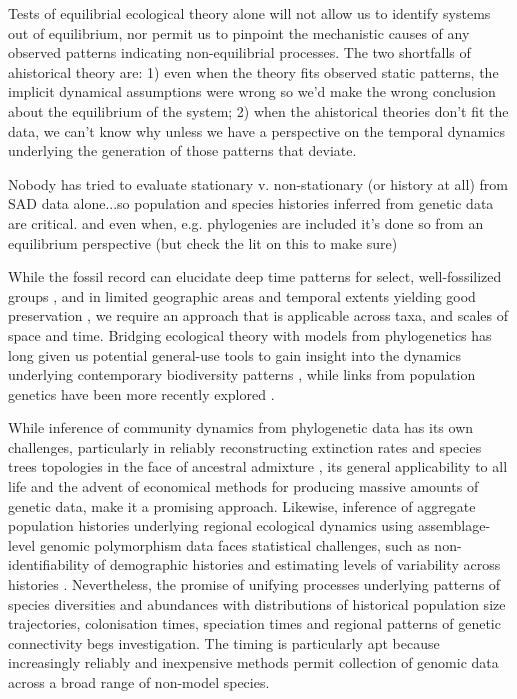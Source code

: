 \documentclass[12pt]{article}
\begin{document}
Tests of equilibrial ecological theory alone will not allow us to
identify systems out of equilibrium, nor permit us to pinpoint the
mechanistic causes of any observed patterns indicating non-equilibrial
processes. The two shortfalls of ahistorical theory are: 1) even when
the theory fits observed static patterns, the implicit dynamical
assumptions were wrong so we'd make the wrong conclusion about the
equilibrium of the system; 2) when the ahistorical theories don't fit
the data, we can't know why unless we have a perspective on the temporal
dynamics underlying the generation of those patterns that deviate.

Nobody has tried to evaluate stationary v. non-stationary (or history at
all) from SAD data alone...so population and species histories inferred
from genetic data are critical. and even when, e.g. phylogenies are
included it's done so from an equilibrium perspective (but check the lit
on this to make sure)

While the fossil record can elucidate deep time patterns for select,
well-fossilized groups \cite{Alroy2008-no}, and in limited geographic
areas and temporal extents yielding good preservation
\cite{Harnik2011-qe}, we require an approach that is applicable across
taxa, and scales of space and time. Bridging ecological theory with
models from phylogenetics has long given us potential general-use
tools to gain insight into the dynamics underlying contemporary
biodiversity patterns \cite{Webb2002-yr, Emerson2002-mw,
  Lavergne2010-ts}, while links from population genetics have been
more recently explored \cite{Webb2002-yr, Emerson2002-mw,
  Lavergne2010-ts, Li2016-ns, McGaughran2015-sy, Laroche2015-qo,
  Vanoverbeke2015-ym, Vellend2005-qd,
  Papadopoulou2011-bd,Dexter2012-rn}.

While inference of community dynamics from phylogenetic data has its
own challenges, particularly in reliably reconstructing extinction
rates \cite{Quental2009-jf} and species trees topologies in the face
of ancestral admixture \cite{Mallet2016-iu,Xu2016-ql}, its general
applicability to all life and the advent of economical methods for
producing massive amounts of genetic data, make it a promising
approach.  Likewise, inference of aggregate population histories
underlying regional ecological dynamics using assemblage-level genomic
polymorphism data faces statistical challenges, such as
non-identifiability of demographic histories \cite{Terhorst2015-mt,
  Robinson2014-vy, Sousa2013-ox} and estimating levels of variability
across histories \cite{Hickerson2014-za}. Nevertheless, the promise of
unifying processes underlying patterns of species diversities and
abundances with distributions of historical population size
trajectories, colonisation times, speciation times and regional
patterns of genetic connectivity begs investigation. The timing is
particularly apt because increasingly reliably and inexpensive methods
permit collection of genomic data across a broad range of non-model
species.
\end{document}
